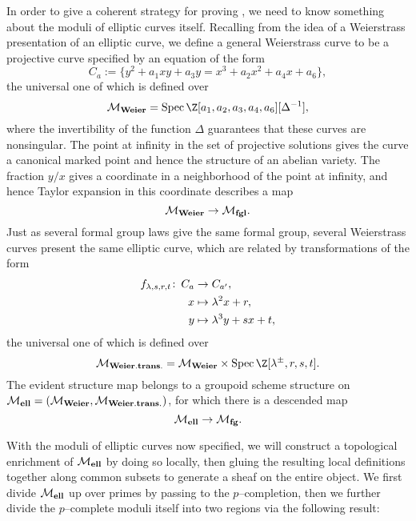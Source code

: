 In order to give a coherent strategy for proving , we need to know something about the moduli of elliptic curves itself.  Recalling from  the idea of a Weierstrass presentation of an elliptic curve, we define a general Weierstrass curve to be a projective curve specified by an equation of the form \[C_a := \{y^2 + a_1xy + a_3y = x^3 + a_2x^2 + a_4x + a_6\},\] the universal one of which is defined over \[\moduli{Weier} = \Spec \Z[a_1, a_2, a_3, a_4, a_6][\Delta^{-1}],\] where the invertibility of the function \(\Delta\) guarantees that these curves are nonsingular.  The point at infinity in the set of projective solutions gives the curve a canonical marked point and hence the structure of an abelian variety.  The fraction \(y/x\) gives a coordinate in a neighborhood of the point at infinity, and hence Taylor expansion in this coordinate describes a map \[\mathcal{M}_{\mathbf{Weier}} \to \mathcal{M}_{\mathbf{fgl}}.\]  Just as several formal group laws give the same formal group, several Weierstrass curves present the same elliptic curve, which are related by transformations of the form
\begin{align*}
f_{\lambda,s,r,t} \colon\thinspace C_a & \to C_{a'}, \\
x & \mapsto \lambda^2 x + r, \\
y & \mapsto \lambda^3 y + sx + t,
\end{align*}
the universal one of which is defined over \[\moduli{Weier.trans.} = \moduli{Weier} \times \Spec \Z[\lambda^{\pm}, r, s, t].\]  The evident structure map belongs to a groupoid scheme structure on \(\mathcal{M}_{\mathbf{ell}} = (\mathcal{M}_{\mathbf{Weier}}, \mathcal{M}_{\mathbf{Weier.trans.}})\), for which there is a descended map \[\mathcal{M}_{\mathbf{ell}} \to \mathcal{M}_{\mathbf{fg}}.\]

With the moduli of elliptic curves now specified, we will construct a topological enrichment of \(\mathcal{M}_{\mathbf{ell}}\) by doing so locally, then gluing the resulting local definitions together along common subsets to generate a sheaf on the entire object.  We first divide \(\mathcal{M}_{\mathbf{ell}}\) up over primes by passing to the \(p\)--completion, then we further divide the \(p\)--complete moduli itself into two regions via the following result:

